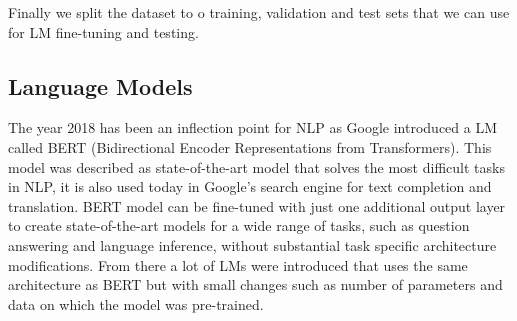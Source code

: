 \documentclass[conference]{IEEEtran}
\begin{document}
\begin{table}[htp]
\centering
{}
\caption{Examples of FEVER claims and labels.}
\label{tab:fever_example}
\end{table}

Finally we split the dataset to o training, validation and test sets that we can use for LM fine-tuning and testing.

\begin{table}[htp]
\centering
{}
\caption{Dataset split sizes for SUPPORTS, REFUTES and NOTENOUGHINFO (NEI) classes.}
\label{tab:fever_splits}
\end{table}

\subsection{Language Models}
The year 2018 has been an inflection point for NLP as Google introduced a LM called BERT (Bidirectional Encoder Representations from Transformers)\cite{devlin2018bert}. This model was described as state-of-the-art model that solves the most difficult tasks in NLP, it is also used today in Google's search engine for text completion and translation. BERT model can be fine-tuned with just one additional output layer to create state-of-the-art models for a wide range of tasks, such as question answering and language inference, without substantial task specific architecture modifications. From there a lot of LMs were introduced that uses the same architecture as BERT but with small changes such as number of parameters and data on which the model was pre-trained.
\end{document}

